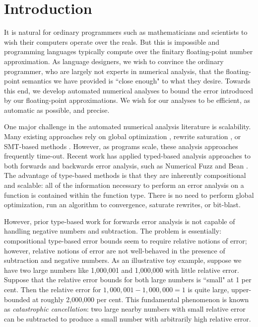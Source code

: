 \section{Introduction}
It is natural for ordinary programmers such as mathematicians and scientists to
wish their computers operate over the reals. 
But this is impossible and programming languages typically compute over the
finitary floating-point number approximation.
As language designers, we wish to convince the ordinary programmer, who are
largely not experts in numerical analysis, that the floating-point semantics we
have provided is ``close enough" to what they desire.
Towards this end, we develop automated numerical analyses to bound the error
introduced by our floating-point approximations. We wish for our analyses to be
efficient, as automatic as possible, and precise.

One major challenge in the automated numerical analysis literature is
scalability. Many existing approaches rely on global optimization
\cite{fptaylor} \cite{satire}, rewrite saturation \cite{gappa}, or SMT-based
methods \cite{rosa}. However, as programs scale, these analysis approaches
frequently time-out. Recent work has applied typed-based analysis approaches to
both forwards and backwards error analysis, such as Numerical Fuzz
\cite{numfuzz} and Bean \cite{bean}. The advantage of type-based methods is that
they are inherently compositional and scalable: all of the information necessary
to perform an error analysis on a function is contained within the function
type. There is no need to perform global optimization, run an algorithm to
convergence, saturate rewrites, or bit-blast.

However, prior type-based work for forwards error analysis is not capable of
handling negative numbers and subtraction. The problem is essentially:
compositional type-based error bounds seem to require relative notions of error;
however, relative notions of error are not well-behaved in the presence of
subtraction and negative numbers. As an illustrative toy example, suppose we
have two large numbers like 1,000,001 and 1,000,000 with little relative error.
Suppose that the relative error bounds for both large numbers is ``small" at 1
per cent. Then the relative error for $1,000,001 - 1,000,000 = 1$ is quite
large, upper-bounded at roughly 2,000,000 per cent.
This fundamental phenomenon is known as \textit{catastrophic cancellation}: two
large nearby numbers with small relative error can be subtracted to produce a
small number with arbitrarily high relative error. 

